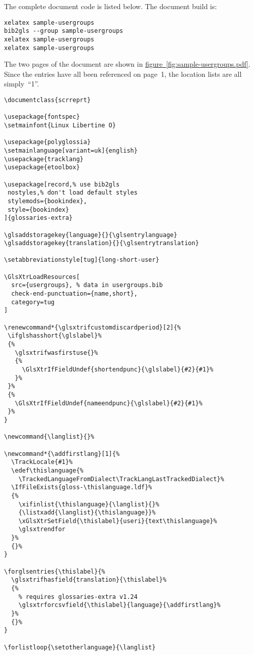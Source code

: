 \documentclass[titlepage=false,index=totoc,bibliography=totoc,
 fontsize=12pt,captions=tableheading]{scrreprt}
\newcommand{\qt}[1]{``#1''}
\newcommand*{\figureref}[1]{\hyperlink{#1-top}{figure~\ref*{#1}}}
\begin{document}
The complete document code is listed below. The document build is:
\begin{verbatim}
xelatex sample-usergroups
bib2gls --group sample-usergroups
xelatex sample-usergroups
xelatex sample-usergroups
\end{verbatim}
The two pages of the document are shown in
\figureref{fig:sample-usergroups.pdf}. Since the entries have all
been referenced on page~1, the location lists are all simply~\qt{1}.

%
\begin{lstlisting}[escapechar=|]
\documentclass{scrreprt}

\usepackage{fontspec}
\setmainfont{Linux Libertine O}

\usepackage{polyglossia}
\setmainlanguage[variant=uk]{english}
\usepackage{tracklang}
\usepackage{etoolbox}

\usepackage[record,% use bib2gls
 nostyles,% don't load default styles
 stylemods={bookindex},
 style={bookindex}
]{glossaries-extra}

\glsaddstoragekey{language}{}{\glsentrylanguage}
\glsaddstoragekey{translation}{}{\glsentrytranslation}

\setabbreviationstyle[tug]{long-short-user}

\GlsXtrLoadResources[
  src={usergroups}, % data in usergroups.bib
  check-end-punctuation={name,short},
  category=tug
]

\renewcommand*{\glsxtrifcustomdiscardperiod}[2]{%
 \ifglshasshort{\glslabel}%
 {%
   \glsxtrifwasfirstuse{}%
   {%
     \GlsXtrIfFieldUndef{shortendpunc}{\glslabel}{#2}{#1}%
   }%
 }%
 {%
   \GlsXtrIfFieldUndef{nameendpunc}{\glslabel}{#2}{#1}%
 }%
}

\newcommand{\langlist}{}%

\newcommand*{\addfirstlang}[1]{%
  \TrackLocale{#1}%
  \edef\thislanguage{%
    \TrackedLanguageFromDialect\TrackLangLastTrackedDialect}%
  \IfFileExists{gloss-\thislanguage.ldf}%
  {%
    \xifinlist{\thislanguage}{\langlist}{}%
    {\listxadd{\langlist}{\thislanguage}}%
    \xGlsXtrSetField{\thislabel}{useri}{text\thislanguage}%
    \glsxtrendfor
  }%
  {}%
}

\forglsentries{\thislabel}{%
  \glsxtrifhasfield{translation}{\thislabel}%
  {%
    % requires glossaries-extra v1.24
    \glsxtrforcsvfield{\thislabel}{language}{\addfirstlang}%
  }%
  {}%
}

\forlistloop{\setotherlanguage}{\langlist}


\end{lstlisting}
\end{document}
